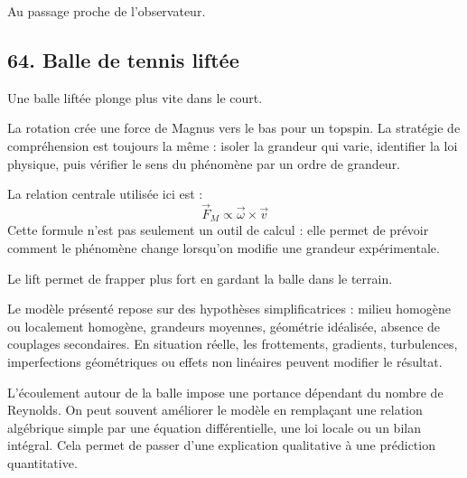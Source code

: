\documentclass[11pt,a4paper]{article}
\begin{document}
\begin{corrigebox}[Indication]
Au passage proche de l'observateur.
\end{corrigebox}


\subsection{64. Balle de tennis liftée}

\begin{exemplebox}
Une balle liftée plonge plus vite dans le court.
\end{exemplebox}

\begin{methodebox}
La rotation crée une force de Magnus vers le bas pour un topspin.
La stratégie de compréhension est toujours la même : isoler la grandeur qui varie, identifier la loi physique, puis vérifier le sens du phénomène par un ordre de grandeur.
\end{methodebox}

\begin{theorembox}
La relation centrale utilisée ici est :
\[
\vec F_M\propto \vec\omega\times \vec v
\]
Cette formule n'est pas seulement un outil de calcul : elle permet de prévoir comment le phénomène change lorsqu'on modifie une grandeur expérimentale.
\end{theorembox}

\begin{odgbox}
Le lift permet de frapper plus fort en gardant la balle dans le terrain.
\end{odgbox}

\begin{attentionbox}
Le modèle présenté repose sur des hypothèses simplificatrices : milieu homogène ou localement homogène, grandeurs moyennes, géométrie idéalisée, absence de couplages secondaires. En situation réelle, les frottements, gradients, turbulences, imperfections géométriques ou effets non linéaires peuvent modifier le résultat.
\end{attentionbox}

\begin{approfondissementbox}
L'écoulement autour de la balle impose une portance dépendant du nombre de Reynolds.
On peut souvent améliorer le modèle en remplaçant une relation algébrique simple par une équation différentielle, une loi locale ou un bilan intégral. Cela permet de passer d'une explication qualitative à une prédiction quantitative.
\end{approfondissementbox}
\end{document}

